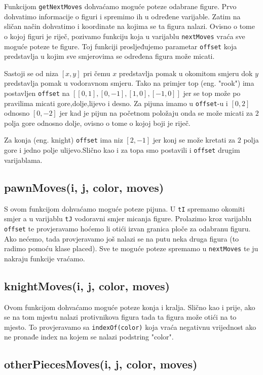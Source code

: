 \documentclass{article}
\begin{document}
Funkcijom \verb|getNextMoves| dohvaćamo moguće poteze odabrane figure. Prvo dohvatimo informacije o figuri i spremimo ih u određene varijable. Zatim na sličan način dohvatimo i koordinate na kojima se ta figura nalazi. Ovisno o tome o kojoj figuri je riječ, pozivamo funkciju koja u varijablu \verb|nextMoves| vraća sve moguće poteze te figure. Toj funkciji prosljeđujemo parametar \verb|offset| koja predstavlja u kojim sve smjerovima se određena figura može micati.

Sastoji se od niza $[x,y]$ pri čemu $x$ predstavlja pomak u okomitom smjeru dok $y$ predstavlja pomak u vodoravnom smjeru. Tako na primjer top (eng. "rook") ima postavljen \verb|offset| na $\left[[0,1],[0,-1],[1,0],[-1,0]\right]$ jer se top može po pravilima micati gore,dolje,lijevo i desno. Za pijuna imamo u \verb|offset|-u i $[0,2]$ odnosno $[0,-2]$ jer kad je pijun na početnom položaju onda se može micati za $2$ polja gore odnosno dolje, ovisno o tome o kojoj boji je riječ.

Za konja (eng. knight) \verb|offset| ima niz $[2,-1]$ jer konj se može kretati za $2$ polja gore i jedno polje ulijevo.Slično kao i za topa smo postavili i \verb|offset| drugim varijablama.

\subsection{pawnMoves(i, j, color, moves)}

S ovom funkcijom dohvaćamo moguće poteze pijuna. U \verb|tI| spremamo okomiti smjer a u varijablu \verb|tJ| vodoravni smjer micanja figure. Prolazimo kroz varijablu \verb|offset| te provjeravamo hoćemo li otići izvan granica ploče za odabranu figuru. Ako nećemo, tada provjeravamo još nalazi se na putu neka druga figura (to radimo pomoću klase placed). Sve te moguće poteze spremamo u \verb|nextMoves| te ju nakraju funkcije vraćamo.

\subsection{knightMoves(i, j, color, moves)}

Ovom funkcijom dohvaćamo moguće poteze konja i kralja. Slično kao i prije, ako se na tom mjestu nalazi protivnikova figura tada ta figura može otići na to mjesto. To provjeravamo sa \verb|indexOf(color)| koja vraća negativnu vrijednost ako ne pronađe index na kojem se nalazi podstring "color".

\subsection{otherPiecesMoves(i, j, color, moves)}
\end{document}
